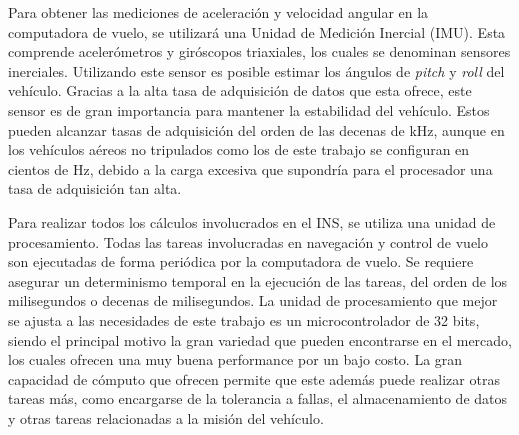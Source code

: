
Para obtener las mediciones de aceleración y velocidad angular en la computadora de vuelo, se utilizará una Unidad de Medición Inercial (IMU). Esta comprende acelerómetros y giróscopos triaxiales, los cuales se denominan sensores inerciales. Utilizando este sensor es posible estimar los ángulos de \textit{pitch} y \textit{roll} del vehículo. Gracias a la alta tasa de adquisición de datos que esta ofrece, este sensor es de gran importancia para mantener la estabilidad del vehículo. Estos pueden alcanzar tasas de adquisición del orden de las decenas de kHz, aunque en los vehículos aéreos no tripulados como los de este trabajo se configuran en cientos de Hz, debido a la carga excesiva que supondría para el procesador una tasa de adquisición tan alta.




%

Para realizar todos los cálculos involucrados en el INS, se utiliza una unidad de procesamiento. Todas las tareas involucradas en navegación y control de vuelo son ejecutadas de forma periódica por la computadora de vuelo. Se requiere asegurar un determinismo temporal en la ejecución de las tareas, del orden de los milisegundos o decenas de milisegundos. La unidad de procesamiento que mejor se ajusta a las necesidades de este trabajo es un microcontrolador de 32 bits, siendo el principal motivo la gran variedad que pueden encontrarse en el mercado, los cuales ofrecen una muy buena performance por un bajo costo. La gran capacidad de cómputo que ofrecen permite que este además puede realizar otras tareas más, como encargarse de la tolerancia a fallas, el almacenamiento de datos y otras tareas relacionadas a la misión del vehículo.

